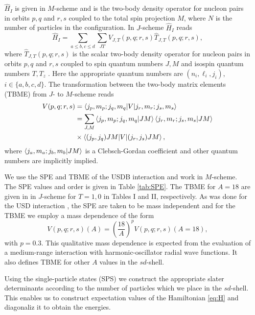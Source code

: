 \documentclass[aps,prl,reprint,groupedaddress]{revtex4-1}  %
\begin{document}
$\hat H_I$ is given in $M$-scheme and is the two-body density operator for nucleon pairs in orbits $p,q$ and $r,s$ coupled to the total spin projection $M$, where $N$ is the number of particles in the configuration. In $J$-scheme $\hat H_I$ reads 
\begin{equation}
	\hat H_I =  \sum_{a\leq b,c \leq d} \sum_{JT} V_{J,T}(p,q;r,s) \hat T_{J,T}(p,q;r,s),
\end{equation}
where $\hat T_{J,T}(p,q;r,s)$ is the scalar two-body density operator for nucleon pairs in orbits $p,q$ and $r,s$ coupled to spin quantum numbers $J,M$ and isospin quantum numbers $T,T_z$ \cite{Brown2006}. Here the appropriate quantum numbers are $(n_i,\ell_i,j_i)$, $i \in \{a,b,c,d\}$. The transformation between the two-body matrix elements (TBME) from $J$- to $M$-scheme reads
\begin{align}
	\nonumber
	V(p,q;r,s) & =  \braket{j_{p},m_{p};j_{q},m_{q}|V|j_{r},m_{r};j_{s},m_{s}} \\ \nonumber
			   & =  \sum_{J,M} \braket{j_{p},m_{p};j_{q},m_{q}|JM} \braket{j_{r},m_{r};j_{s},m_{s}|JM} \\
			   &	\times \braket{(j_{p},j_{q})JM|V|(j_{r},j_{s})JM},
\end{align}
where $\braket{j_{a},m_{a};j_{b},m_{b}|JM}$ is a Clebsch-Gordan coefficient and other quantum numbers are implicitly implied.

We use the SPE and TBME of the USDB interaction \cite{Brown2006} and work in $M$-scheme. The SPE values and order is given in Table \ref{tab:SPE}. The TBME for $A=18$ are given in \cite{Brown2006} in $J$-scheme for $T=1,0$ in Tables I and II, respectively. As was done for the USD interaction \cite{Wildenthal1984}, the SPE are taken to be mass independent and for the TBME we employ a mass dependence of the form
\begin{equation}
	V(p,q;r,s)(A) = \left( \frac{18}{A} \right)^p V(p,q;r,s)(A=18),
\end{equation}
with $p=0.3$. This qualitative mass dependence is expected from the evaluation of a medium-range interaction with harmonic-oscillator radial wave functions. It also defines TBME for other $A$ values in the $sd$-shell.

Using the single-particle states (SPS) we construct the appropriate slater determinants according to the number of particles which we place in the $sd$-shell. This enables us to construct expectation values of the Hamiltonian \eqref{eq:H} and diagonaliz it to obtain the energies. 
\end{document}
